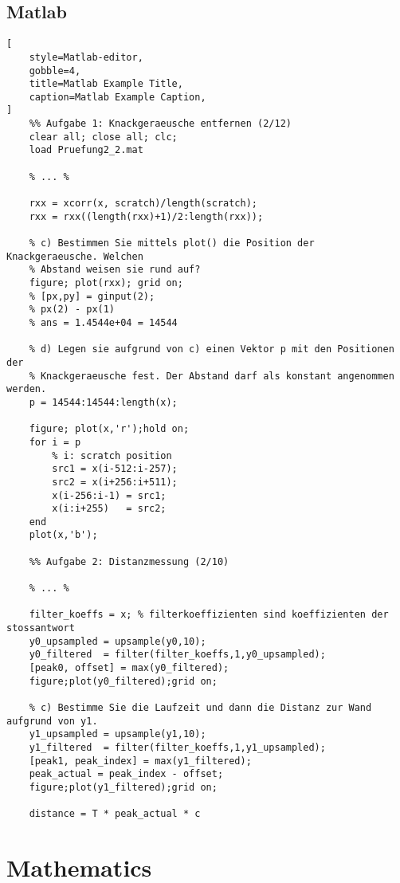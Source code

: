 \documentclass[a4paper,11pt,oneside,showtrims]{alpenthesis}
\begin{document}
\section{Matlab}

\begin{lstlisting}[
    style=Matlab-editor,
    gobble=4,
    title=Matlab Example Title,
    caption=Matlab Example Caption,
]
    %% Aufgabe 1: Knackgeraeusche entfernen (2/12)
    clear all; close all; clc;
    load Pruefung2_2.mat

    % ... %

    rxx = xcorr(x, scratch)/length(scratch);
    rxx = rxx((length(rxx)+1)/2:length(rxx));

    % c) Bestimmen Sie mittels plot() die Position der Knackgeraeusche. Welchen
    % Abstand weisen sie rund auf?
    figure; plot(rxx); grid on;
    % [px,py] = ginput(2);
    % px(2) - px(1)
    % ans = 1.4544e+04 = 14544

    % d) Legen sie aufgrund von c) einen Vektor p mit den Positionen der
    % Knackgeraeusche fest. Der Abstand darf als konstant angenommen werden.
    p = 14544:14544:length(x);

    figure; plot(x,'r');hold on;
    for i = p
        % i: scratch position
        src1 = x(i-512:i-257);
        src2 = x(i+256:i+511);
        x(i-256:i-1) = src1;
        x(i:i+255)   = src2;
    end
    plot(x,'b');

    %% Aufgabe 2: Distanzmessung (2/10)

    % ... %

    filter_koeffs = x; % filterkoeffizienten sind koeffizienten der stossantwort
    y0_upsampled = upsample(y0,10);
    y0_filtered  = filter(filter_koeffs,1,y0_upsampled);
    [peak0, offset] = max(y0_filtered);
    figure;plot(y0_filtered);grid on;

    % c) Bestimme Sie die Laufzeit und dann die Distanz zur Wand aufgrund von y1.
    y1_upsampled = upsample(y1,10);
    y1_filtered  = filter(filter_koeffs,1,y1_upsampled);
    [peak1, peak_index] = max(y1_filtered);
    peak_actual = peak_index - offset;
    figure;plot(y1_filtered);grid on;

    distance = T * peak_actual * c
\end{lstlisting}

\chapter{Mathematics} %
\end{document}
